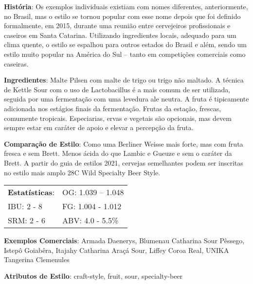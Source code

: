 \textbf{História}: Os exemplos individuais existiam com nomes diferentes, anteriormente, no Brasil, mas o estilo se tornou popular com esse nome depois que foi definido formalmente, em 2015, durante uma reunião entre cervejeiros profissionais e caseiros em Santa Catarina. Utilizando ingredientes locais, adequado para um clima quente, o estilo se espalhou para outros estados do Brasil e além, sendo um estilo muito popular na América do Sul – tanto em competições comerciais como caseiras.

\textbf{Ingredientes}: Malte Pilsen com malte de trigo ou trigo não maltado. A técnica de Kettle Sour com o uso de Lactobacillus é a mais comum de ser utilizada, seguida por uma fermentação com uma levedura ale neutra. A fruta é tipicamente adicionada nos estágios finais da fermentação. Frutas da estação, frescas, comumente tropicais. Especiarias, ervas e vegetais são opcionais, mas devem sempre estar em caráter de apoio e elevar a percepção da fruta.

\textbf{Comparação de Estilo}: Como uma Berliner Weisse mais forte, mas com fruta fresca e sem Brett. Menos ácida do que Lambic e Gueuze e sem o caráter da Brett. A partir do guia de estilos 2021, cervejas semelhantes podem ser inscritas no estilo mais amplo 28C Wild Specialty Beer Style.

\begin{tabular}{@{}p{35mm}p{35mm}@{}}
  \textbf{Estatísticas}: & OG: 1.039 – 1.048\\
  IBU: 2 - 8 & FG: 1.004 - 1.012 \\
  SRM: 2 - 6  & ABV: 4.0 - 5.5\%
\end{tabular}

\textbf{Exemplos Comerciais}: Armada Daenerys, Blumenau Catharina Sour Pêssego, Istepô Goiabêra, Itajahy Catharina Araçá Sour, Liffey Coroa Real, UNIKA Tangerina Clemenules

\textbf{Atributos de Estilo}: craft-style, fruit, sour, specialty-beer
